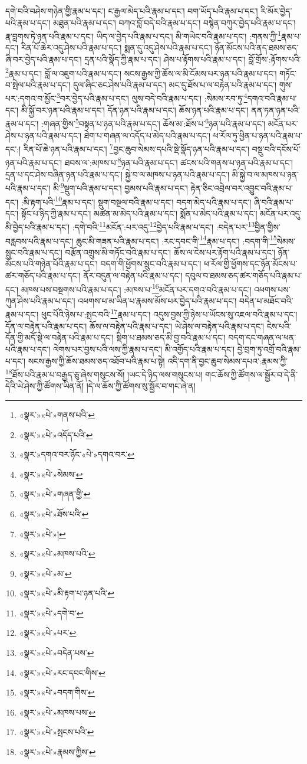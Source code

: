 དགེ་བའི་བཤེས་གཉེན་གྱི་རྣམ་པ་དང་། ང་རྒྱལ་མེད་པའི་རྣམ་པ་དང་། བག་ཡོད་པའི་རྣམ་པ་དང་། རི་མོར་བྱེད་པའི་རྣམ་པ་དང་། མཐུན་པའི་རྣམ་པ་དང་། བཀའ་བློ་བདེ་བའི་རྣམ་པ་དང་། བསྙེན་བཀུར་བྱེད་པའི་རྣམ་པ་དང་། རྣ་བླགས་ཏེ་ཉན་པའི་རྣམ་པ་དང་། ཡིད་ལ་བྱེད་པའི་རྣམ་པ་དང་། མི་གཡེང་བའི་རྣམ་པ་དང་། :གནས་ཀྱི་\footnote{«སྣར་»«པེ་»གནས་པའི་}རྣམ་པ་དང་། རིན་པོ་ཆེར་འདུ་ཤེས་པའི་རྣམ་པ་དང་། སྨན་དུ་འདུ་ཤེས་པའི་རྣམ་པ་དང་། ཉོན་མོངས་པའི་ནད་ཐམས་ཅད་ཞི་བར་བྱེད་པའི་རྣམ་པ་དང་། དྲན་པའི་སྣོད་ཀྱི་རྣམ་པ་དང་། ཤེས་པ་རྟོགས་པའི་རྣམ་པ་དང་། བློ་གྲོས་:རྟོགས་པའི་\footnote{«སྣར་»«པེ་»འདོད་པའི་}རྣམ་པ་དང་། བློ་ལ་འཇུག་པའི་རྣམ་པ་དང་། སངས་རྒྱས་ཀྱི་ཆོས་ལ་མི་ངོམས་པར་ཉན་པའི་རྣམ་པ་དང་། གཏོང་བ་སྤེལ་པའི་རྣམ་པ་དང་། དུལ་ཞིང་ཅང་ཤེས་པའི་རྣམ་པ་དང་། མང་དུ་ཐོས་པ་ལ་བརྟེན་པའི་རྣམ་པ་དང་། གུས་པར་:དགའ་བ་མྱོང་\footnote{«སྣར་»དགའ་བར་ཉོང་«པེ་»དགའ་བར་}བར་བྱེད་པའི་རྣམ་པ་དང་། ལུས་བདེ་བའི་རྣམ་པ་དང་། :སེམས་རབ་ཏུ་\footnote{«སྣར་»«པེ་»སེམས་}དགའ་བའི་རྣམ་པ་དང་། མི་སྐྱོ་བར་ཉན་པའི་རྣམ་པ་དང་། དོན་ཉན་པའི་རྣམ་པ་དང་། ཆོས་ཉན་པའི་རྣམ་པ་དང་། ནན་ཏན་ཉན་པའི་རྣམ་པ་དང་། :གཞན་གྱིས་\footnote{«སྣར་»«པེ་»གཞན་གྱི་}བསྟན་པ་ཉན་པའི་རྣམ་པ་དང་། ཆོས་མ་:ཐོས་པ་\footnote{«སྣར་»«པེ་»ཐོས་པའི་}ཉན་པའི་རྣམ་པ་དང་། མངོན་པར་ཤེས་པ་ཉན་པའི་རྣམ་པ་དང་། ཐེག་པ་གཞན་ལ་འདོད་པ་མེད་པའི་རྣམ་པ་དང་། ཕ་རོལ་ཏུ་ཕྱིན་པ་ཉན་པའི་རྣམ་པ་དང་:། རིན་པོ་ཆེ་ཉན་པའི་རྣམ་པ་དང་། \footnote{«སྣར་»«པེ་»།  }བྱང་ཆུབ་སེམས་དཔའི་སྡེ་སྣོད་ཉན་པའི་རྣམ་པ་དང་། བསྡུ་བའི་དངོས་པོ་ཉན་པའི་རྣམ་པ་དང་། ཐབས་ལ་:མཁས་པ་\footnote{«སྣར་»«པེ་»མཁས་པའི་}ཉན་པའི་རྣམ་པ་དང་། ཚངས་པའི་གནས་པ་ཉན་པའི་རྣམ་པ་དང་། དྲན་པ་དང་ཤེས་བཞིན་ཉན་པའི་རྣམ་པ་དང་། སྐྱེ་བ་ལ་མཁས་པ་ཉན་པའི་རྣམ་པ་དང་། མི་སྐྱེ་བ་ལ་མཁས་པ་ཉན་པའི་རྣམ་པ་དང་། མི་\footnote{«སྣར་»«པེ་»མ་}སྡུག་པའི་རྣམ་པ་དང་། བྱམས་པའི་རྣམ་པ་དང་། རྟེན་ཅིང་འབྲེལ་བར་འབྱུང་བའི་རྣམ་པ་དང་། :མི་རྟག་པའི་\footnote{«སྣར་»«པེ་»མི་རྟག་པ་ཉན་པའི་}རྣམ་པ་དང་། སྡུག་བསྔལ་བའི་རྣམ་པ་དང་། བདག་མེད་པའི་རྣམ་པ་དང་། ཞི་བའི་རྣམ་པ་དང་། སྟོང་པ་ཉིད་ཀྱི་རྣམ་པ་དང་། མཚན་མ་མེད་པའི་རྣམ་པ་དང་། སྨོན་པ་མེད་པའི་རྣམ་པ་དང་། མངོན་པར་འདུ་མི་བྱེད་པའི་རྣམ་པ་དང་། :དགེ་བའི་\footnote{«སྣར་»«པེ་»དགེ་བ་}མངོན་:པར་འདུ་\footnote{«སྣར་»«པེ་»པར་}བྱེད་པའི་རྣམ་པ་དང་། :བདེན་པར་\footnote{«སྣར་»«པེ་»བདེན་པས་}བྱིན་གྱིས་བརླབས་པའི་རྣམ་པ་དང་། ཆུང་མི་གཟན་པའི་རྣམ་པ་དང་། :རང་དབང་གི་\footnote{«སྣར་»«པེ་»རང་དབང་གིས་}རྣམ་པ་དང་། :བདག་གི་\footnote{«སྣར་»«པེ་»བདག་གིས་}སེམས་སྲུང་བའི་རྣམ་པ་དང་། བརྩོན་འགྲུས་མི་གཏོང་བའི་རྣམ་པ་དང་། ཆོས་ལ་ངེས་པར་རྟོག་པའི་རྣམ་པ་དང་། ཉོན་མོངས་པའི་གཉེན་པོའི་རྣམ་པ་དང་། བདག་གི་ཕྱོགས་སྲུང་བའི་རྣམ་པ་དང་། ཕ་རོལ་གྱི་ཕྱོགས་དང་ཉོན་མོངས་པ་ཚར་གཅོད་པའི་རྣམ་པ་དང་། ནོར་བདུན་ལ་བརྟེན་པའི་རྣམ་པ་དང་། དབུལ་བ་ཐམས་ཅད་ཚར་གཅོད་པའི་རྣམ་པ་དང་། མཁས་པས་བསྔགས་པའི་རྣམ་པ་དང་། :མཁས་པ་\footnote{«སྣར་»«པེ་»མཁས་པས་}མངོན་པར་དགའ་བའི་རྣམ་པ་དང་། འཕགས་པས་ཀུན་ཤེས་པའི་རྣམ་པ་དང་། འཕགས་པ་མ་ཡིན་པ་རྣམས་མོས་པར་བྱེད་པའི་རྣམ་པ་དང་། བདེན་པ་མཐོང་བའི་རྣམ་པ་དང་། ཕུང་པོའི་ཉེས་པ་:སྤང་བའི་\footnote{«སྣར་»«པེ་»སྤངས་པའི་}རྣམ་པ་དང་། འདུས་བྱས་ཀྱི་ཉེས་པ་ཡོངས་སུ་འཇལ་བའི་རྣམ་པ་དང་། དོན་ལ་བརྟེན་པའི་རྣམ་པ་དང་། ཆོས་ལ་བརྟེན་པའི་རྣམ་པ་དང་། ཡེ་ཤེས་ལ་བརྟེན་པའི་རྣམ་པ་དང་། ངེས་པའི་དོན་གྱི་མདོ་སྡེ་ལ་བརྟེན་པའི་རྣམ་པ་དང་། སྡིག་པ་ཐམས་ཅད་མི་བྱ་བའི་རྣམ་པ་དང་། བདག་དང་གཞན་ལ་ཕན་པའི་རྣམ་པ་དང་། ལེགས་པར་བྱས་པའི་ལས་ཀྱི་རྣམ་པ་དང་། མི་འགྱོད་པའི་རྣམ་པ་དང་། བྱེ་བྲག་ཏུ་འགྲོ་བའི་རྣམ་པ་དང་། སངས་རྒྱས་ཀྱི་ཆོས་ཐམས་ཅད་འཐོབ་པའི་རྣམ་པ་སྟེ། འདི་དག་ནི་བྱང་ཆུབ་སེམས་དཔའ་:རྣམས་ཀྱི་\footnote{«སྣར་»«པེ་»རྣམས་ཀྱིས་}ཐོས་པའི་རྣམ་པ་བརྒྱད་ཅུ་ཞེས་གསུངས་སོ། །ཡང་དེ་ཉིད་ལས་གསུངས་པ། གང་ཆོས་ཀྱི་ཚོགས་ལ་སྦྱོར་བ་དེ་ནི་དེའི་ཡེ་ཤེས་ཀྱི་ཚོགས་ཡིན་ནོ། །དེ་ལ་ཆོས་ཀྱི་ཚོགས་སུ་སྦྱོར་བ་གང་ཞེ་ན། 